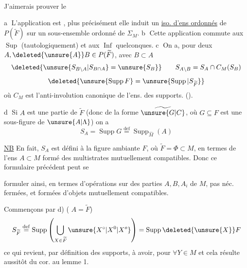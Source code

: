 
J'aimerais prouver le

\uline{} \textcircled{a} L'application  est , plus précisément elle induit un \uline{iso. d'ens ordonnés} de $P(\widetilde F)$ sur  un sous-ensemble ordonné de $\Sigma_M$. \textcircled{b} Cette application  commute aux $\operatorname{Sup}$  (tautologiquement) et aux $\operatorname{Inf}$ quelconques. \textcircled{c} On a, pour deux $A,\deleted{\unsure{A}}B\in P(\widetilde F)$, avec $B\subset A$
\[
\deleted{\unsure{S_{B\setminus A}|S_{B\cap A}}=\unsure{S_B}}
\qquad S_{A\setminus B}=S_A\cap C_M(S_B)
\]
\[
\deleted{\unsure{\operatorname{Supp}F}=\unsure{\operatorname{Supp}|S_{\widetilde F}}}
\]
où $C_M$ est l'anti-involution canonique de l'ens. des supports. ().

\textcircled{d}  Si $A$ est une partie  de $\widetilde F$ (donc de la forme $\widetilde{\unsure{G|C}}$, où $G\subseteq F$ est une sous-figure de $\unsure{A|\Lambda}$) on a
\[
S_A=\operatorname{Supp}G\overset{\mathrm{def}}=\operatorname{Supp}_{\widehat M}(A)
\]

\uline{NB} En fait, $S_A$ est défini  à la figure ambiante \deleted{\unsure{\(\Phi\)}} $F$, où $\widetilde F=\Phi\subset M$, en termes de l'ens $A\subset M$ formé des multistrates mutuellement compatibles. Donc  ce formulaire précédent peut se

formuler ainsi, en termes d'opérations sur des parties $A,B,A_i$ de $M$, pas néc. fermées, et formées d'objets mutuellement compatibles.

Commençons par d) ( $A=\widetilde F$)
\[
S_{\widetilde F}\overset{\mathrm{def}}=\operatorname{Supp}\left(\bigcup_{X\in\widetilde F}\unsure{X^\circ|X^0|X^o}\right)=\operatorname{Supp}\deleted{\unsure{X}}F
\]
ce qui revient, par définition des supports, à avoir, pour $\forall Y\in M$
et cela résulte aussitôt du cor. au lemme 1.

